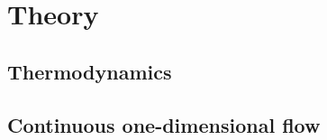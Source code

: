 \section{Theory}
\begin{multicols}{2}
\subsection*{Thermodynamics}


\subsection*{Continuous one-dimensional flow}

\end{multicols}
